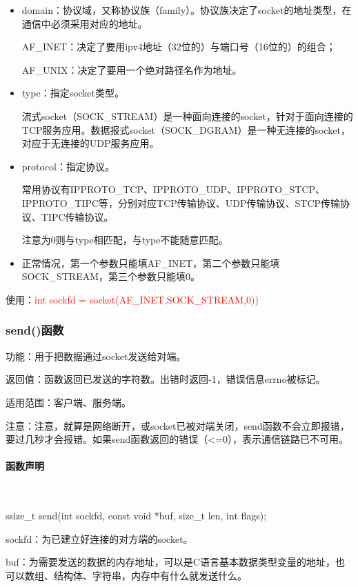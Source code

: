 \documentclass[UTF8]{article}%
\begin{document}
\begin{itemize}
    \item domain：协议域，又称协议族（family）。协议族决定了socket的地址类型，在通信中必须采用对应的地址。
    
        AF\_INET：决定了要用ipv4地址（32位的）与端口号（16位的）的组合；

        AF\_UNIX：决定了要用一个绝对路径名作为地址。

    \item type：指定socket类型。
    
        流式socket（SOCK\_STREAM）是一种面向连接的socket，针对于面向连接的TCP服务应用。数据报式socket（SOCK\_DGRAM）是一种无连接的socket，对应于无连接的UDP服务应用。

    \item protocol：指定协议。
    
        常用协议有IPPROTO\_TCP、IPPROTO\_UDP、IPPROTO\_STCP、IPPROTO\_TIPC等，分别对应TCP传输协议、UDP传输协议、STCP传输协议、TIPC传输协议。

        注意为0则与type相匹配，与type不能随意匹配。

    \item 正常情况，第一个参数只能填AF\_INET，第二个参数只能填SOCK\_STREAM，第三个参数只能填0。
\end{itemize}

使用：\textcolor{red}{int sockfd = socket(AF\_INET,SOCK\_STREAM,0))}

\subsubsection{send()函数}

功能：用于把数据通过socket发送给对端。

返回值：函数返回已发送的字符数。出错时返回-1，错误信息errno被标记。

适用范围：客户端、服务端。

注意：注意，就算是网络断开，或socket已被对端关闭，send函数不会立即报错，要过几秒才会报错。如果send函数返回的错误（<=0），表示通信链路已不可用。

\paragraph{函数声明}~{}

ssize\_t send(int sockfd, const void *buf, size\_t len, int flags);

sockfd：为已建立好连接的对方端的socket。

buf：为需要发送的数据的内存地址，可以是C语言基本数据类型变量的地址，也可以数组、结构体、字符串，内存中有什么就发送什么。
\end{document}
